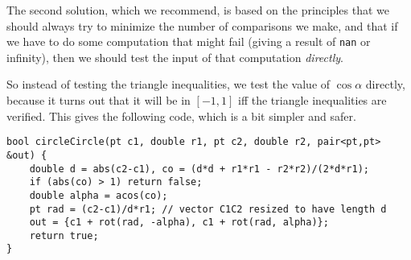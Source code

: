 The second solution, which we recommend, is based on the principles that we should always try to minimize the number of comparisons we make, and that if we have to do some computation that might fail (giving a result of \lstinline|nan| or infinity), then we should test the input of that computation \emph{directly}.

So instead of testing the triangle inequalities, we test the value of $\cos\alpha$ directly, because it turns out that it will be in $[-1,1]$ iff the triangle inequalities are verified. This gives the following code, which is a bit simpler and safer.
\begin{lstlisting}
bool circleCircle(pt c1, double r1, pt c2, double r2, pair<pt,pt> &out) {
    double d = abs(c2-c1), co = (d*d + r1*r1 - r2*r2)/(2*d*r1);
    if (abs(co) > 1) return false;
    double alpha = acos(co);
    pt rad = (c2-c1)/d*r1; // vector C1C2 resized to have length d
    out = {c1 + rot(rad, -alpha), c1 + rot(rad, alpha)};
    return true;
}
\end{lstlisting}
